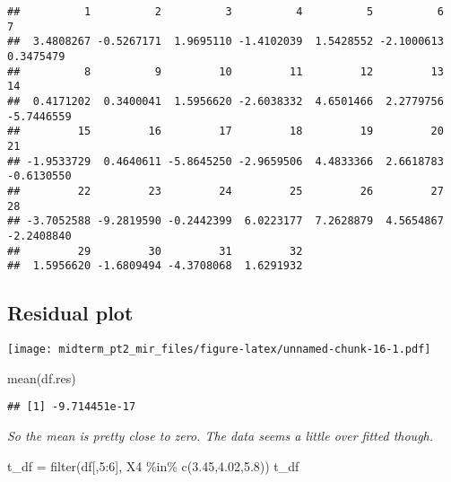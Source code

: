 \documentclass[
]{article}
\newenvironment{Shaded}{\begin{snugshade}}{\end{snugshade}}
\newcommand{\AttributeTok}[1]{\textcolor[rgb]{0.77,0.63,0.00}{#1}}
\newcommand{\DecValTok}[1]{\textcolor[rgb]{0.00,0.00,0.81}{#1}}
\newcommand{\FloatTok}[1]{\textcolor[rgb]{0.00,0.00,0.81}{#1}}
\newcommand{\FunctionTok}[1]{\textcolor[rgb]{0.00,0.00,0.00}{#1}}
\newcommand{\NormalTok}[1]{#1}
\newcommand{\OtherTok}[1]{\textcolor[rgb]{0.56,0.35,0.01}{#1}}
\newcommand{\SpecialCharTok}[1]{\textcolor[rgb]{0.00,0.00,0.00}{#1}}
\newcommand{\StringTok}[1]{\textcolor[rgb]{0.31,0.60,0.02}{#1}}
\begin{document}
\begin{verbatim}
##          1          2          3          4          5          6          7 
##  3.4808267 -0.5267171  1.9695110 -1.4102039  1.5428552 -2.1000613  0.3475479 
##          8          9         10         11         12         13         14 
##  0.4171202  0.3400041  1.5956620 -2.6038332  4.6501466  2.2779756 -5.7446559 
##         15         16         17         18         19         20         21 
## -1.9533729  0.4640611 -5.8645250 -2.9659506  4.4833366  2.6618783 -0.6130550 
##         22         23         24         25         26         27         28 
## -3.7052588 -9.2819590 -0.2442399  6.0223177  7.2628879  4.5654867 -2.2408840 
##         29         30         31         32 
##  1.5956620 -1.6809494 -4.3708068  1.6291932
\end{verbatim}

\hypertarget{residual-plot}{%
\subsection{Residual plot}\label{residual-plot}}

\begin{Shaded}
\end{Shaded}

\texttt{[image: midterm\_pt2\_mir\_files/figure-latex/unnamed-chunk-16-1.pdf]}

\begin{Shaded}
\begin{Highlighting}[]
\FunctionTok{mean}\NormalTok{(df.res)}
\end{Highlighting}
\end{Shaded}

\begin{verbatim}
## [1] -9.714451e-17
\end{verbatim}

\emph{So the mean is pretty close to zero. The data seems a little over
fitted though.}

\begin{Shaded}
\begin{Highlighting}[]
\NormalTok{t\_df }\OtherTok{=} \FunctionTok{filter}\NormalTok{(df[,}\DecValTok{5}\SpecialCharTok{:}\DecValTok{6}\NormalTok{], X4 }\SpecialCharTok{\%in\%} \FunctionTok{c}\NormalTok{(}\FloatTok{3.45}\NormalTok{,}\FloatTok{4.02}\NormalTok{,}\FloatTok{5.8}\NormalTok{))}
\NormalTok{t\_df}
\end{Highlighting}
\end{Shaded}
\end{document}
